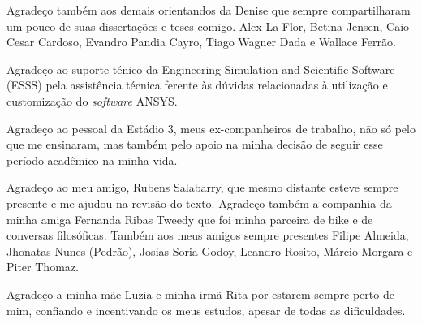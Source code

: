 Agradeço também aos demais orientandos da Denise que sempre compartilharam um pouco de suas dissertações e teses comigo. Alex La Flor,  Betina Jensen, Caio Cesar Cardoso, Evandro Pandia Cayro, Tiago Wagner Dada e Wallace Ferrão. 

Agradeço ao suporte ténico da Engineering Simulation and Scientific Software (ESSS) pela assistência técnica ferente às dúvidas relacionadas à utilização e customização do \textit{software} ANSYS.

Agradeço ao pessoal da Estádio 3, meus ex-companheiros de trabalho, não só pelo que me ensinaram, mas também pelo apoio na minha decisão de seguir esse período acadêmico na minha vida.

Agradeço ao meu amigo, Rubens Salabarry, que mesmo distante esteve sempre presente e me ajudou na revisão do texto. Agradeço também a companhia da minha amiga Fernanda Ribas Tweedy que foi minha parceira de bike e de conversas filosóficas. Também aos meus amigos sempre presentes
 Filipe Almeida,
 Jhonatas Nunes (Pedrão),
 Josias Soria Godoy,
Leandro Rosito,
 Márcio Morgara e Piter Thomaz. 

Agradeço a minha mãe Luzia e minha irmã Rita por estarem sempre perto de mim, confiando e incentivando os meus estudos, apesar de todas as dificuldades.



